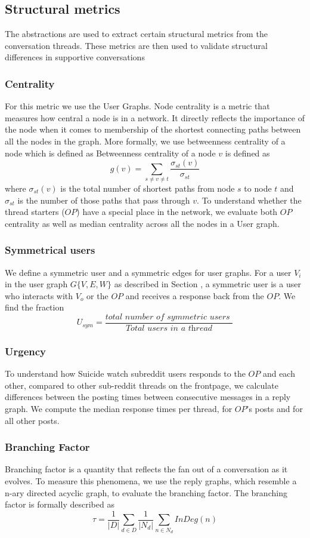 \subsection{Structural metrics}
The abstractions are used to extract certain structural metrics from the conversation threads. These metrics are then used to validate structural differences in supportive conversations 
\subsubsection{Centrality}
For this metric we use the User Graphs. Node centrality is a metric that measures how central a node is in a network. It directly reflects the importance of the node when it comes to membership of the shortest connecting paths between all the nodes in the graph. More formally, we use betweenness centrality of a node which is defined as 
Betweenness centrality of a node $v$ is defined as 
$$
g(v) = \sum_{s \neq v \neq t}\frac{\sigma_{st}(v)}{\sigma_{st}}
$$
where $\sigma_{st}(v)$ is the total number of shortest paths from node $s$ to node $t$ and $\sigma_{st}$ is the number of those paths that pass through $v$. To understand whether the thread starters ($OP$) have a special place in the network, we evaluate both $OP$ centrality as well as median centrality across all the nodes in a User graph.

\subsubsection{Symmetrical users}
We define a symmetric user and a symmetric edges for user graphs. For a user $V_i$ in the user graph $G\{V,E,W\}$ as described in Section
, a symmetric user is a user who interacts with $V_o$ or the $OP$ and receives a response back from the $OP$. We find the fraction 
$$
U_{sym}=\frac{\textit{total number of symmetric users }}{\textit{Total users in a thread}}
$$

\subsubsection{Urgency}
To understand how Suicide watch subreddit users responds to the $OP$ and each other, compared to other sub-reddit threads on the frontpage, we calculate differences between the posting times between consecutive messages in a reply graph. We compute the median response times per thread, for $OP$'s posts and for all other posts. 

\subsubsection{Branching Factor}
Branching factor is a quantity that reflects the fan out of a conversation as it evolves.
To measure this phenomena, we use the reply graphs, which resemble a n-ary directed acyclic graph, to evaluate the branching factor. The branching factor is formally described as 
$$\tau = \frac{1}{|D|} \sum_{d \in D}^{} \frac{1}{|N_d|} \sum_{n\in N_d}^{} \textit{InDeg}(n)$$



